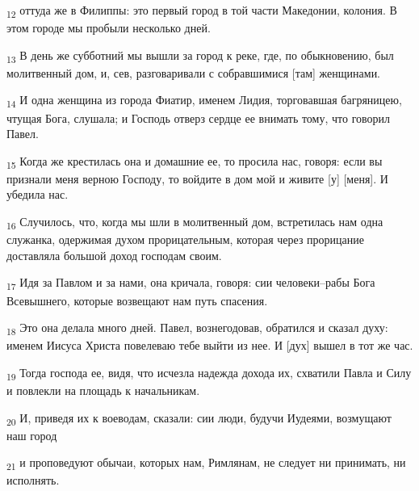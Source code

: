 \begin{tcolorbox}
\textsubscript{12} оттуда же в Филиппы: это первый город в той части Македонии, колония. В этом городе мы пробыли несколько дней.
\end{tcolorbox}
\begin{tcolorbox}
\textsubscript{13} В день же субботний мы вышли за город к реке, где, по обыкновению, был молитвенный дом, и, сев, разговаривали с собравшимися [там] женщинами.
\end{tcolorbox}
\begin{tcolorbox}
\textsubscript{14} И одна женщина из города Фиатир, именем Лидия, торговавшая багряницею, чтущая Бога, слушала; и Господь отверз сердце ее внимать тому, что говорил Павел.
\end{tcolorbox}
\begin{tcolorbox}
\textsubscript{15} Когда же крестилась она и домашние ее, то просила нас, говоря: если вы признали меня верною Господу, то войдите в дом мой и живите [у] [меня]. И убедила нас.
\end{tcolorbox}
\begin{tcolorbox}
\textsubscript{16} Случилось, что, когда мы шли в молитвенный дом, встретилась нам одна служанка, одержимая духом прорицательным, которая через прорицание доставляла большой доход господам своим.
\end{tcolorbox}
\begin{tcolorbox}
\textsubscript{17} Идя за Павлом и за нами, она кричала, говоря: сии человеки--рабы Бога Всевышнего, которые возвещают нам путь спасения.
\end{tcolorbox}
\begin{tcolorbox}
\textsubscript{18} Это она делала много дней. Павел, вознегодовав, обратился и сказал духу: именем Иисуса Христа повелеваю тебе выйти из нее. И [дух] вышел в тот же час.
\end{tcolorbox}
\begin{tcolorbox}
\textsubscript{19} Тогда господа ее, видя, что исчезла надежда дохода их, схватили Павла и Силу и повлекли на площадь к начальникам.
\end{tcolorbox}
\begin{tcolorbox}
\textsubscript{20} И, приведя их к воеводам, сказали: сии люди, будучи Иудеями, возмущают наш город
\end{tcolorbox}
\begin{tcolorbox}
\textsubscript{21} и проповедуют обычаи, которых нам, Римлянам, не следует ни принимать, ни исполнять.
\end{tcolorbox}
